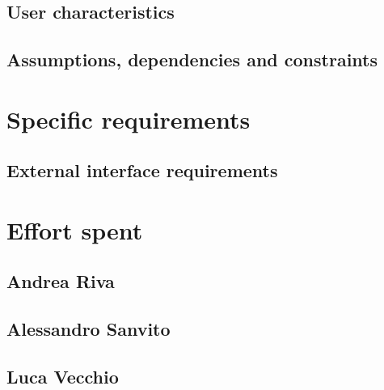 \documentclass[10pt,english, openany]{book}
\begin{document}


\section{User characteristics}



\section{Assumptions, dependencies and constraints}



\chapter{Specific requirements}

\section{External interface requirements}



\chapter{Effort spent}

\section{Andrea Riva}



\section{Alessandro Sanvito}



\section{Luca Vecchio}



\pagebreak
\end{document}

